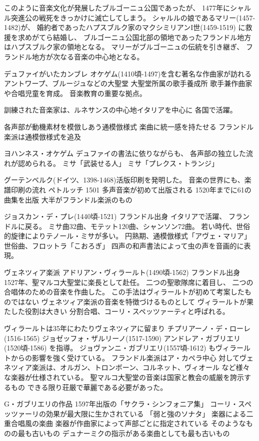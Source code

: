\documentclass[a4j]{jarticle}
\begin{document}
このように音楽文化が発展したブルゴーニュ公国であったが、
1477年にシャルル突進公の戦死をきっかけに滅亡してしまう。
シャルルの娘であるマリー(1457-1482)が、
婚約者であったハプスブルク家のマクシミリアンI世(1459-1519)
に救援を求めがてら結婚し、
ブルゴーニュ公国北部の領地であったフランドル地方はハプスブルク家の領地となる。
マリーがブルゴーニュの伝統を引き継ぎ、
フランドル地方が次なる音楽の中心地となる。

デュファイがいたカンブレ
オケゲム(1410頃-1497)を含む著名な作曲家が訪れる
アントワープ、ブルージュなどの大聖堂
大聖堂所属の歌手養成所
歌手兼作曲家や合唱児童を育成。
音楽教育の重要な拠点。

訓練された音楽家は、ルネサンスの中心地イタリアを中心に
各国で活躍。

各声部が動機素材を模倣しあう通模倣様式
楽曲に統一感を持たせる
フランドル楽派は通模倣様式を追及

ヨハンネス・オケゲム
デュファイの書法に依りながらも、
各声部の独立した流れが認められる。
ミサ「武装せる人」
ミサ「プレクス・トランジ」

グーテンベルク(ドイツ、1398-1468)活版印刷を発明した。
音楽の世界にも、楽譜印刷の流れ
ペトルッチ
1501 多声音楽が初めて出版される
1520年までに61の曲集を出版
大半がフランドル楽派のもの

ジョスカン・デ・プレ(1440頃-1521)
フランドル出身
イタリアで活躍、
フランドルに戻る。
ミサ曲32曲、モテット120曲、シャンソン72曲。
若い時代、世俗的旋律によりテノール・ミサが多い。
円熟期、通模倣様式「アヴェ・マリア」
世俗曲、フロットラ「こおろぎ」
四声の和声書法によって虫の声を音画的に表現。

ヴェネツィア楽派
アドリアン・ヴィラールト(1490頃-1562)
フランドル出身
1527年、聖マルコ大聖堂に楽長として赴任。
二つの聖歌隊席に着目し、
二つの合唱体のための音楽を作曲した。
この手法はヴィラールトが初めて考案したものではない
ヴェネツィア楽派の音楽を特徴づけるものとして
ヴィラールトが果たした役割は大きい
分割合唱、コーリ・スペッツァーティと呼ばれる。

ヴィラールトは35年にわたりヴェネツィアに留まり
チプリアーノ・デ・ローレ(1516-1565)
ジョゼッフォ・ザルリーノ(1517-1590)
アンドレア・ガブリエリ(1520頃-1586)
を指導。
ジョヴァンニ・ガブリエリ(1557頃-1612)
もヴィラールトからの影響を強く受けている。
フランドル楽派はア・カペラ中心
対してヴェネツィア楽派は、オルガン、トロンボーン、コルネット、ヴィオール
など様々な楽器が仕様されている。
聖マルコ大聖堂の音楽は国家と教会の威厳を誇示するもの
できる限り荘厳で華麗である必要があった。

G・ガブリエリの作品
1597年出版の「サクラ・シンフォニア集」
コーリ・スペッツァーリの効果が最大限に生かされている
「弱と強のソナタ」
楽器による二重合唱風の楽曲
楽器が作曲家によって声部ごとに指定されている
そのようなものの最も古いもの
デュナーミクの指示がある楽曲としても最も古いもの
\end{document}
